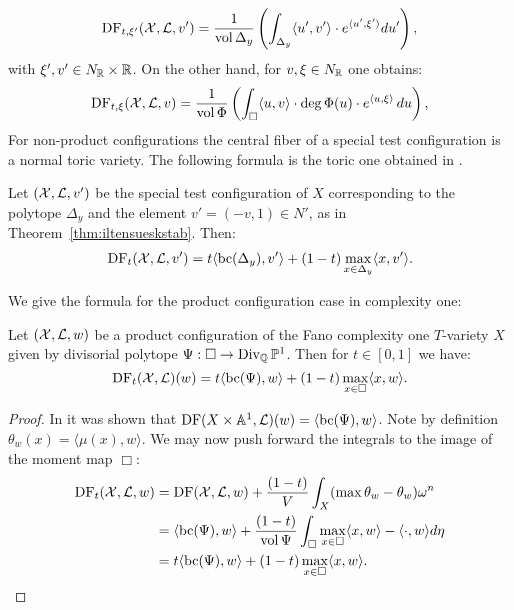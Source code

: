 \begin{equation}
\mathop{\rm DF}\nolimits_{t,\xi'}({\mathcal{X}},\mathcal{L},v') = \frac{1}{\mathop{\rm vol}\nolimits \Delta_y}\left(\int_{\Delta_y} \langle u', v' \rangle \cdot e^{\langle u', \xi'\rangle} du'\right),\label{eq:futaki-character}
\end{equation}
with $\xi',v' \in N_{\mathbb{R}} \times \mathbb{R}$. On the other hand, for $v,\xi \in N_{\mathbb{R}}$ one obtains:
\begin{equation}
\mathop{\rm DF}\nolimits_{t,\xi}({\mathcal{X}},\mathcal{L},v) = \frac{1}{\mathop{\rm vol}\nolimits \Phi }\left(\int_{\Box} \langle u, v \rangle \cdot \deg \Phi(u) \cdot e^{\langle u, \xi \rangle}\, du\right)
, \label{eq:futaki-general-fibre}
\end{equation}
For non-product configurations the central fiber of a special test configuration is a normal toric variety. The following formula is the toric one obtained in \cite{datar2016kahler}.
\begin{lemma} \label{lem:nonprodDF} Let \(({\mathcal{X}},\mathcal{L},v')\) be the special test configuration of \(X\) corresponding to the polytope \(\Delta_y\) and the element \(v' = (-v,1) \in N'\), as in Theorem~\ref{thm:iltensueskstab}. Then:
\[
\mathop{\rm DF}\nolimits_t( {\mathcal{X}}, \mathcal{L},v')  = t \langle \mathop{\rm bc}\nolimits(\Delta_y), v' \rangle + (1-t) \max_{x \in \Delta_y} \langle x, v' \rangle.
\]
\end{lemma}
We give the formula for the product configuration case in complexity one:
\begin{lemma}
Let \(({\mathcal{X}},\mathcal{L},w)\) be a product configuration of the Fano complexity one \(T\)-variety \(X\) given by divisorial polytope \(\Psi: \Box \to \operatorname{Div}_{\mathbb{Q}} \mathbb{P}^1\). Then for \(t \in [0,1]\) we have:
\begin{equation} \label{eq:productDF}
\mathop{\rm DF}\nolimits_t({\mathcal{X}},\mathcal{L})(w) = t \langle  \mathop{\rm bc}\nolimits(\Psi), w \rangle + (1-t)\max_{x \in \Box} \langle x,w \rangle.
\end{equation}
\end{lemma}
\begin{proof}
In \cite{ilten2015} it was shown that \(\mathop{\rm DF}\nolimits(X \times \mathbb{A}^1,\mathcal{L})(w)  = \langle  \mathop{\rm bc}\nolimits(\Psi), w \rangle \). Note by definition \(\theta_w(x) = \langle \mu(x) , w \rangle\). We may now push forward the integrals to the image of the moment map \(\Box\):
\begin{align*}
\mathop{\rm DF}\nolimits_t({\mathcal{X}},\mathcal{L},w) &=   \mathop{\rm DF}\nolimits({\mathcal{X}},\mathcal{L},w) + \frac{(1-t)}{V} \int_{X} (\max \theta_w - \theta_w) \omega^n \\ &= \langle  \mathop{\rm bc}\nolimits(\Psi), w \rangle + \frac{(1-t)}{\mathop{\rm vol}\nolimits \Psi} \int_\Box \max_{x \in \Box} \langle x,w \rangle  - \langle \cdot, w \rangle d \eta \\
&= t \langle  \mathop{\rm bc}\nolimits(\Psi), w \rangle + (1-t)\max_{x \in \Box} \langle x,w \rangle.
\end{align*}
\end{proof}
